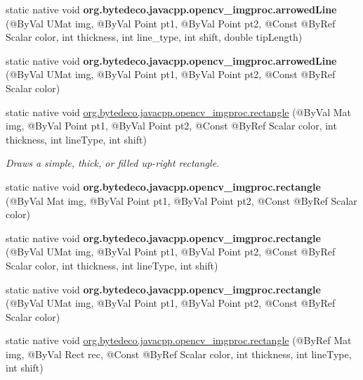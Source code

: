 \begin{DoxyCompactItemize}
\item 
\mbox{\label{group__imgproc__draw_ga02af158e1edeb4ea5a3e2ac42f228bfc}} 
static native void {\bfseries org.\+bytedeco.\+javacpp.\+opencv\+\_\+imgproc.\+arrowed\+Line} (@By\+Val U\+Mat img, @By\+Val Point pt1, @By\+Val Point pt2, @Const @By\+Ref Scalar color, int thickness, int line\+\_\+type, int shift, double tip\+Length)
\item 
\mbox{\label{group__imgproc__draw_ga101f9afb4d23576b498eb89905b4c24e}} 
static native void {\bfseries org.\+bytedeco.\+javacpp.\+opencv\+\_\+imgproc.\+arrowed\+Line} (@By\+Val U\+Mat img, @By\+Val Point pt1, @By\+Val Point pt2, @Const @By\+Ref Scalar color)
\item 
static native void \hyperlink{group__imgproc__draw_ga011e780e69d07eab5e5e6ac46d4d8dde}{org.\+bytedeco.\+javacpp.\+opencv\+\_\+imgproc.\+rectangle} (@By\+Val Mat img, @By\+Val Point pt1, @By\+Val Point pt2, @Const @By\+Ref Scalar color, int thickness, int line\+Type, int shift)
\begin{DoxyCompactList}\small\item\em Draws a simple, thick, or filled up-\/right rectangle. \end{DoxyCompactList}\item 
\mbox{\label{group__imgproc__draw_ga6ee4b8e571d2f2ebbb100a854ecb2818}} 
static native void {\bfseries org.\+bytedeco.\+javacpp.\+opencv\+\_\+imgproc.\+rectangle} (@By\+Val Mat img, @By\+Val Point pt1, @By\+Val Point pt2, @Const @By\+Ref Scalar color)
\item 
\mbox{\label{group__imgproc__draw_ga19fb1bab5b4e8ff022135aa967a84c3b}} 
static native void {\bfseries org.\+bytedeco.\+javacpp.\+opencv\+\_\+imgproc.\+rectangle} (@By\+Val U\+Mat img, @By\+Val Point pt1, @By\+Val Point pt2, @Const @By\+Ref Scalar color, int thickness, int line\+Type, int shift)
\item 
\mbox{\label{group__imgproc__draw_ga4c619e8273911d134b6bd84ccb3724d6}} 
static native void {\bfseries org.\+bytedeco.\+javacpp.\+opencv\+\_\+imgproc.\+rectangle} (@By\+Val U\+Mat img, @By\+Val Point pt1, @By\+Val Point pt2, @Const @By\+Ref Scalar color)
\item 
static native void \hyperlink{group__imgproc__draw_ga35715bd59f4d006c97366b20cdc4499e}{org.\+bytedeco.\+javacpp.\+opencv\+\_\+imgproc.\+rectangle} (@By\+Ref Mat img, @By\+Val Rect rec, @Const @By\+Ref Scalar color, int thickness, int line\+Type, int shift)

\end{DoxyCompactItemize}
